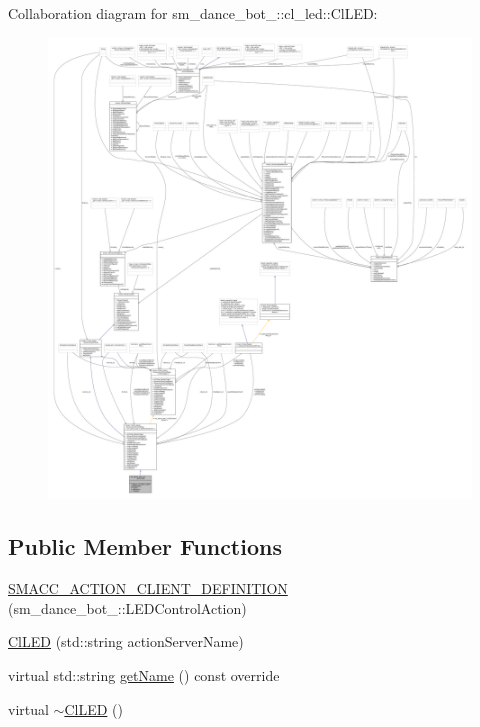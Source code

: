 Collaboration diagram for sm\+\_\+dance\+\_\+bot\+\_\+:\+:cl\+\_\+led\+:\+:Cl\+L\+ED\+:
\nopagebreak
\begin{figure}[H]
\begin{center}
\leavevmode
\includegraphics[width=350pt]{classsm__dance__bot__2_1_1cl__led_1_1ClLED__coll__graph}
\end{center}
\end{figure}
\subsection*{Public Member Functions}
\begin{DoxyCompactItemize}
\item 
\hyperlink{classsm__dance__bot__2_1_1cl__led_1_1ClLED_aa90e141f886853f8277b8db254fa981c}{S\+M\+A\+C\+C\+\_\+\+A\+C\+T\+I\+O\+N\+\_\+\+C\+L\+I\+E\+N\+T\+\_\+\+D\+E\+F\+I\+N\+I\+T\+I\+ON} (sm\+\_\+dance\+\_\+bot\+\_\+::\+L\+E\+D\+Control\+Action)
\item 
\hyperlink{classsm__dance__bot__2_1_1cl__led_1_1ClLED_a2958867a431b772bb5d797cc742b36bf}{Cl\+L\+ED} (std\+::string action\+Server\+Name)
\item 
virtual std\+::string \hyperlink{classsm__dance__bot__2_1_1cl__led_1_1ClLED_a8d0ff178a2228a1b1c32142987f860dc}{get\+Name} () const override
\item 
virtual \hyperlink{classsm__dance__bot__2_1_1cl__led_1_1ClLED_a178f98debe2450ed80afd19c757224f0}{$\sim$\+Cl\+L\+ED} ()
\end{DoxyCompactItemize}
